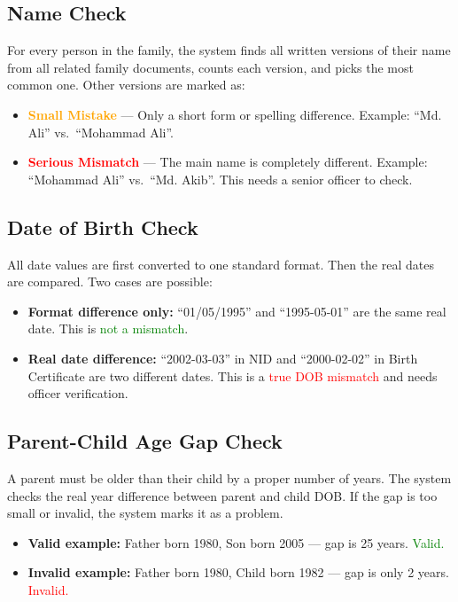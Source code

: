 \documentclass[12pt, a4paper]{article}
\begin{document}
\subsection{Name Check}

For every person in the family, the system finds all written versions of
their name from all related family documents, counts each version, and
picks the most common one. Other versions are marked as:

\begin{itemize}
    \item \textcolor{orange}{\textbf{Small Mistake}} --- Only a short form
          or spelling difference. Example: ``Md. Ali'' vs.\ ``Mohammad Ali''.
    \item \textcolor{red}{\textbf{Serious Mismatch}} --- The main name is
          completely different. Example: ``Mohammad Ali'' vs.\ ``Md. Akib''.
          This needs a senior officer to check.
\end{itemize}

\subsection{Date of Birth Check}

All date values are first converted to one standard format.
Then the real dates are compared. Two cases are possible:

\begin{itemize}
    \item \textbf{Format difference only:} ``01/05/1995'' and ``1995-05-01''
          are the same real date. This is \textcolor{green}{not a mismatch}.
    \item \textbf{Real date difference:} ``2002-03-03'' in NID and
          ``2000-02-02'' in Birth Certificate are two different dates.
          This is a \textcolor{red}{true DOB mismatch} and needs
          officer verification.
\end{itemize}

\subsection{Parent-Child Age Gap Check}

A parent must be older than their child by a proper number of years.
The system checks the real year difference between parent and child DOB.
If the gap is too small or invalid, the system marks it as a problem.

\begin{itemize}
    \item \textbf{Valid example:} Father born 1980, Son born 2005 ---
          gap is 25 years. \textcolor{green}{Valid.}
    \item \textbf{Invalid example:} Father born 1980, Child born 1982 ---
          gap is only 2 years. \textcolor{red}{Invalid.}
\end{itemize}
\end{document}
